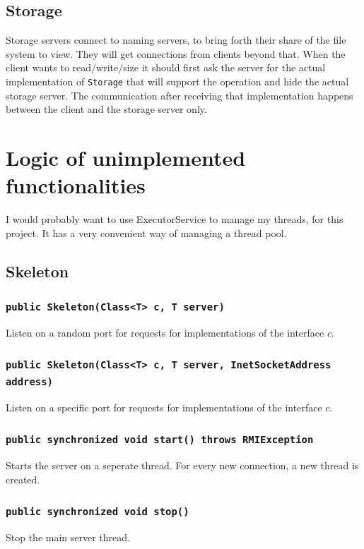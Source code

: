 \documentclass [10pt, a4paper]{article}
\begin{document}
\subsection {Storage}
Storage servers connect to naming servers, to bring forth their share of the
file system to view. They will get connections from clients beyond that. When
the client wants to read/write/size it should first ask the server for the
actual implementation of \texttt{Storage} that will support the operation and
hide the actual storage server. The communication after receiving that
implementation happens between the client and the storage server only.

\section {Logic of unimplemented functionalities}

I would probably want to use ExecutorService to manage my threads, for this
project. It has a very convenient way of managing a thread pool.

\subsection {Skeleton}

\subsubsection {\texttt{public Skeleton(Class<T> c, T server)}}
Listen on a random port for requests for implementations of the interface $c$.

\subsubsection {\texttt{public Skeleton(Class<T> c, T server, InetSocketAddress
address)}}
Listen on a specific port for requests for implementations of the interface $c$.

\subsubsection {\texttt{public synchronized void start() throws RMIException}}
Starts the server on a seperate thread. For every new connection, a new thread
is created.

\subsubsection {\texttt{public synchronized void stop()}}
Stop the main server thread.
\end{document}
